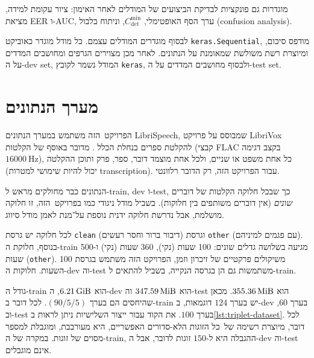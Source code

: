 \documentclass[hebrew, a4paper]{article}
\theoremstyle{plain}
\theoremstyle{definition}
\numberwithin{equation}{section}
\begin{document}
מוגדרות גם פונקציות לבדיקת הביצועים של המודלים לאחר האימון: ציור עקומת
למידה, מציאת EER ו-AUC, ערך הסף האופטימלי,
$C_{\mathrm{det}}^{\mathrm{min}}$, וניתוח בלבול (confusion analysis).

לבסוף מוגדרים המודלים עצמם. כל מודל מוגדר כאוביקט
\verb|keras.Sequential|, מודפס סיכום, ומיוצרת רשת משולשת שמאומנת על
הנתונים. לאחר מכן מצוירים הגרפים ומחושבים המדדים על ה-dev set, המודל
נשמר לקובץ \verb|keras|, ולבסוף מחושבים המדדים על ה-test set.

\section{מערך הנתונים}
\label{sec:dataset}

הפרויקט~הזה משתמש במערך הנתונים LibriSpeech, שמבוסס על פרויקט LibriVox
להקלטת ספרים בנחלת הכלל . מדובר באוסף של הקלטות
(קבצי FLAC בקצב דגימה $\SI{16000}{\Hz}$), כל אחת משפט או שניים, ולכל
אחת מוצמד דובר, ספר, פרק ותוכן ההקלטה (יכול להיות שימושי למטרות
transcription). עבור הפרויקט הזה, רק הדובר רלוונטי.

הנתונים כבר מחולקים מראש ל-\textenglish{train}, \textenglish{dev}
ו-\textenglish{test}, כך שבכל חלוקה הקלטות של דוברים \emph{שונים} (אין
דוברים משותפים בין חלוקות). בשביל מודל ניגודי כמו בפרויקט~הזה, זו
חלוקה מושלמת, אבל נדרשת חלוקה ידנית נוספת על־מנת לאמן מודל סיווג.

לכל חלוקה יש גרסת \verb|clean| (דיבור ברור וחסר רעשים) וגרסת
\verb|other| (עם פגמים למיניהם). בנוסף, חלוקת ה-train מגיעה בשלושה
גדלים שונים: 100 שעות (נקי), 360 שעות (נקי) ו-500 שעות (\verb|other|).
משיקולים פרקטיים של זיכרון וזמן, הפרויקט הזה משתמש בגרסת 100 השעות.
חלוקות ה-dev וה-test משתמשות גם הן בגרסה הנקייה, בשביל להתאים ל-train.

גודל ה-train הוא $\SI{6.21}{\gibi\byte}$, ה-dev הוא
$\SI{347.59}{\mebi\byte}$ וה-test הוא $\SI{355.36}{\mebi\byte}$. מכאן
שהיחסים הם בערך $(90/5/5)$. לכל דובר ב-train יש בערך $\num{124}$
דוגמאות, ב-dev בערך $\num{60}$, וב-test בערך $\num{100}$. את הקוד עבור
ייצור השלישיות ניתן לראות ב\autoref{lst:triplet-dataset}. לכל דובר,
מיוצרת רשימה של~כל הזוגות הלא-סדורים האפשריים, היא מעורבבת, ומוגבלת
למספר מסוים של זוגות. במקרה של ה-train, ההגבלה היא ל-$\num{150}$ זוגות
לדובר, אבל ה-dev וה-test אינם מוגבלים.

\begin{listing}[hbtp]
  \inputminted{python}{snippets/TripletDataset.py}
  \caption{בחירת השלישיות עבור triplet loss}
  \label{lst:triplet-dataset}
\end{listing}
\end{document}
